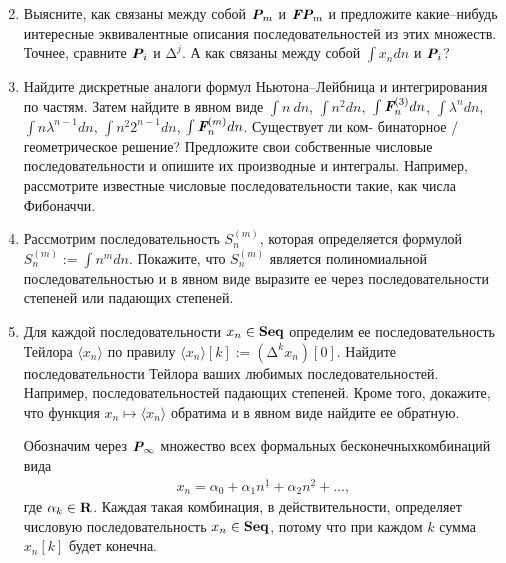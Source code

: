 \begin{enumerate}
\setcounter{enumi}{1}
\item Выясните, как связаны между собой $\text{\bfseries\itshape P}_m$ и $\text{\bfseries\itshape FP}_m$ и предложите какие--нибудь интересные эквивалентные описания последовательностей из этих множеств. Точнее, сравните $\text{\bfseries\itshape P}_i$ и $\text{Δ}^{j}$. А как связаны между собой $\int x_n dn$ и $\text{\bfseries\itshape P}_i$? 
\item Найдите дискретные аналоги формул Ньютона--Лейбница и интегрирования по частям. Затем найдите в явном виде $\int n\ dn$, $\int n^2 dn,$
$\int \text{\bfseries\itshape F}_n^{(3)} dn$,
$\int \lambda^n dn$,
$\int n \lambda^{n-1} dn$,
$\int n^2 \textrm{2}^{n-1} dn$,
$\int \text{\bfseries\itshape F}_n^{(m)} dn$. Существует ли ком- бинаторное / геометрическое решение? Предложите свои собственные числовые последовательности и опишите их производные и интегралы. Например, рассмотрите известные числовые последовательности такие, как числа Фибоначчи.

\item Рассмотрим последовательность $S_n^{(m)}$, которая определяется формулой $S_n^{(m)} := \int n^m dn$. Покажите, что $S_n^{(m)}$ является полиномиальной последовательностью и в явном виде выразите ее через последовательности степеней или падающих степеней. 

\item Для каждой последовательности $x_n \in \text{\bfseries Seq}$ определим ее последовательность Тейлора $\langle x_n \rangle$ по правилу $\langle x_n \rangle [k] := (\text{Δ}^k x_n)[0]$. Найдите последовательности Тейлора ваших любимых последовательностей. Например, последовательностей падающих степеней. Кроме того, докажите, что функция $x_n \mapsto \langle x_n \rangle$ обратима и в явном виде найдите ее обратную.

Обозначим через $\text{\bfseries\itshape P}_\infty$ множество всех формальных бесконечных\linebreak комбинаций вида
\begin{align*}
x_n = \alpha_0 + \alpha_1 n^{\underline{1}} + \alpha_2 n^{\underline{2}} + \ldots,
\end{align*}
где $\alpha_k \in \text{\bfseries R}$. Каждая такая комбинация, в действительности, определяет числовую последовательность $x_n \in \text{\bfseries Seq}$, потому что при каждом $k$ сумма $x_n[k]$ будет конечна.


\end{enumerate}
